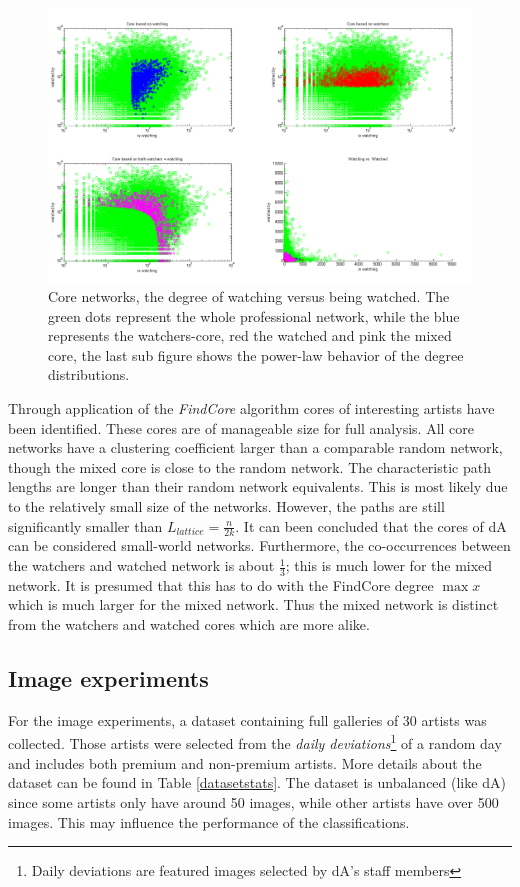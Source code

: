 \begin{figure}[htb]
  \centering
  \includegraphics[width=1\linewidth]{img/core.png}
  \caption{Core networks, the degree of watching versus being watched.  The green dots represent the whole professional network, while the blue represents the watchers-core, red the watched and pink the mixed core, the last sub figure shows the power-law behavior of the degree distributions.}
  \label{fig:results_core}
\end{figure}

Through application of the \textit{FindCore} algorithm cores of interesting artists have been identified. These cores are of manageable size for full analysis.  All core networks have a clustering coefficient larger than a comparable random network, though the mixed core is close to the random network. The characteristic path lengths are longer than their random network equivalents. This is most likely due to the relatively small size of the networks. However, the paths are still significantly smaller than $L_{lattice}=\frac{n}{2k}$. It can been concluded that the cores of dA can be considered small-world networks.  
Furthermore, the co-occurrences between the watchers and watched network is about $\frac{1}{3}$; this is much lower for the mixed network. It is presumed that this has to do with the FindCore degree $\max x$ which is much larger for the mixed network. Thus the mixed network is distinct from the watchers and watched cores which are more alike.



\subsection{Image experiments}
For the image experiments, a dataset containing full galleries of 30 artists was collected.
Those artists were selected from the \textit{daily deviations}\footnote{Daily deviations are featured images selected by dA's staff members} of a random day and includes both premium and non-premium artists. 
More details about the dataset can be found in Table \ref{datasetstats}. 
The dataset is unbalanced (like dA) since some artists only have around 50 images, while other artists have over 500 images. This may influence the performance of the classifications.



